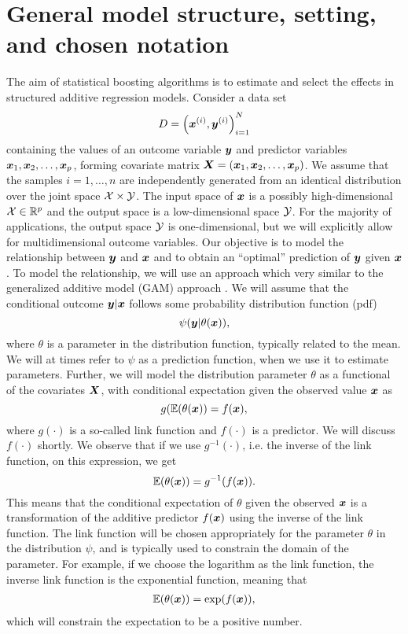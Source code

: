 \section{General model structure, setting, and chosen notation} %
The aim of statistical boosting algorithms is to estimate and select the effects in structured additive regression models.
Consider a data set
\begin{equation*}
    D=\left(\bm{x}^{(i)},\bm{y}^{(i)}\right)_{i=1}^N
\end{equation*}
containing the values of an outcome variable $\bm{y}$ and predictor variables $\bm{x}_1, \bm{x}_2,\ldots,\bm{x}_p$, forming covariate matrix $\bm{X}=(\bm{x}_1, \bm{x}_2,\ldots,\bm{x}_p)$.
We assume that the samples $i=1,\ldots,n$ are independently generated from an identical distribution over the joint space $\mathcal{X}\times\mathcal{Y}$.
The input space of $\bm{x}$ is a possibly high-dimensional $\mathcal{X}\in\mathbb{R}^p$ and the output space is a low-dimensional space $\mathcal{Y}$.
For the majority of applications, the output space $\mathcal{Y}$ is one-dimensional, but we will explicitly allow for multidimensional outcome variables.
Our objective is to model the relationship between $\bm{y}$ and $\bm{x}$ and to obtain an ``optimal'' prediction of $\bm{y}$ given $\bm{x}$.
To model the relationship, we will use an approach which very similar to the generalized additive model (GAM) approach \citep{gam-book}.
We will assume that the conditional outcome $\bm{y}|\bm{x}$ follows some probability distribution function (pdf)
\begin{equation}\label{eq:psi}
    \psi(\bm{y}|\theta(\bm{x})),
\end{equation}
where $\theta$ is a parameter in the distribution function, typically related to the mean. We will at times refer to $\psi$ as a prediction function, when we use it to estimate parameters.
Further, we will model the distribution parameter $\theta$ as a functional of the covariates $\bm{X}$, with conditional expectation given the observed value $\bm{x}$ as
\begin{equation}
    g(\mathbb{E}(\theta(\bm{x}))=f(\bm{x}),
\end{equation}
where $g(\cdot)$ is a so-called link function and $f(\cdot)$ is a predictor.
We will discuss $f(\cdot)$ shortly.
We observe that if we use $g^{-1}(\cdot)$, i.e. the inverse of the link function, on this expression, we get
\begin{equation*}
    \mathbb{E}(\theta(\bm{x}))=g^{-1}(f(\bm{x})).
\end{equation*}
This means that the conditional expectation of $\theta$ given the observed $\bm{x}$ is a transformation of the additive predictor $f(\bm{x})$ using the inverse of the link function.
The link function will be chosen appropriately for the parameter $\theta$ in the distribution $\psi$, and is typically used to constrain the domain of the parameter.
For example, if we choose the logarithm as the link function, the inverse link function is the exponential function, meaning that
\begin{align}
    \mathbb{E}(\theta(\bm{x}))=\exp(f(\bm{x})),
\end{align}
which will constrain the expectation to be a positive number.

